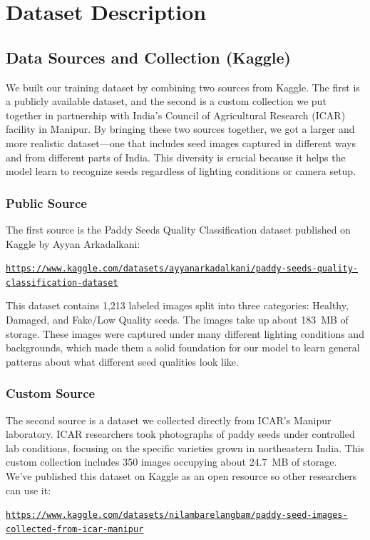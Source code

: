 
\section{Dataset Description}

\subsection{Data Sources and Collection (Kaggle)}

We built our training dataset by combining two sources from Kaggle. The first is a publicly available dataset, and the second is a custom collection we put together in partnership with India's Council of Agricultural Research (ICAR) facility in Manipur. By bringing these two sources together, we got a larger and more realistic dataset—one that includes seed images captured in different ways and from different parts of India. This diversity is crucial because it helps the model learn to recognize seeds regardless of lighting conditions or camera setup.

\subsubsection{Public Source}
The first source is the Paddy Seeds Quality Classification dataset published on Kaggle by Ayyan Arkadalkani:
\begin{center}
\href{https://www.kaggle.com/datasets/ayyanarkadalkani/paddy-seeds-quality-classification-dataset}{\nolinkurl{https://www.kaggle.com/datasets/ayyanarkadalkani/paddy-seeds-quality-classification-dataset}}
\end{center}

This dataset contains 1,213 labeled images split into three categories: Healthy, Damaged, and Fake/Low Quality seeds. The images take up about 183~MB of storage. These images were captured under many different lighting conditions and backgrounds, which made them a solid foundation for our model to learn general patterns about what different seed qualities look like.

\subsubsection{Custom Source}
The second source is a dataset we collected directly from ICAR's Manipur laboratory. ICAR researchers took photographs of paddy seeds under controlled lab conditions, focusing on the specific varieties grown in northeastern India. This custom collection includes 350 images occupying about 24.7~MB of storage. We've published this dataset on Kaggle as an open resource so other researchers can use it:
\begin{center}
\href{https://www.kaggle.com/datasets/nilambarelangbam/paddy-seed-images-collected-from-icar-manipur}{\nolinkurl{https://www.kaggle.com/datasets/nilambarelangbam/paddy-seed-images-collected-from-icar-manipur}}
\end{center}

